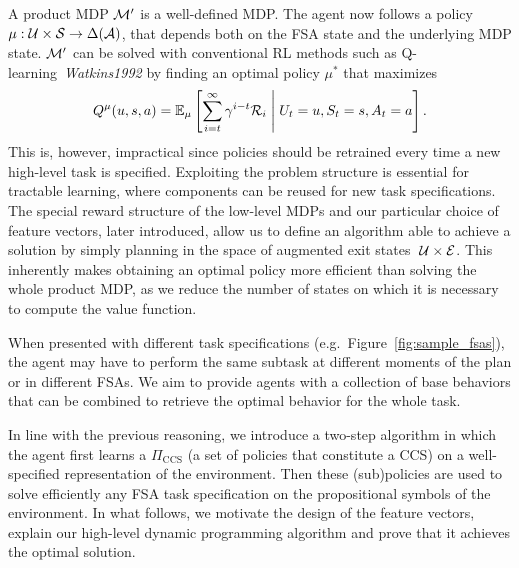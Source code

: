A product MDP $\mathcal{M}'$ is a well-defined MDP. The agent now follows a policy $\mu:\mathcal{U}\times\mathcal{S}\rightarrow\Delta(\mathcal{A})$, that depends both on the FSA state and the underlying MDP state. $\mathcal{M}'$ can be solved with conventional RL methods such as Q-learning~\textit{Watkins1992} by finding an optimal policy $\mu^*$ that maximizes
\begin{equation*}
Q^\mu(u, s, a) = \mathbb{E}_{\mu}\left[\sum_{i=t}^\infty \gamma^{i-t}\mathcal{R}_i\;\middle\lvert\;U_t= u, S_t=s, A_t=a\right].
\end{equation*}
This is, however, impractical since policies should be retrained every time a new high-level task is specified. Exploiting the problem structure is essential for tractable learning, where components can be reused for new task specifications. The special reward structure of the low-level MDPs and our particular choice of feature vectors, later introduced, allow us to define an algorithm able to achieve a solution by simply planning in the space of augmented exit states $\;\mathcal{U}\times\mathcal{E}$. This inherently makes obtaining an optimal policy more efficient than solving the whole product MDP, as we reduce the number of states on which it is necessary to compute the value function.

 When presented with different task specifications (e.g.~Figure~\ref{fig:sample_fsas}), the agent may have to perform the same subtask at different moments of the plan or in different FSAs. We aim to provide agents with a collection of base behaviors that can be combined to retrieve the optimal behavior for the whole task.

In line with the previous reasoning, we introduce a two-step algorithm in which the agent first learns a $\Pi_{\text{CCS}}$ (a set of policies that constitute a CCS) on a well-specified representation of the environment. Then these (sub)policies are used to solve efficiently any FSA task specification on the propositional symbols of the environment. In what follows, we motivate the design of the feature vectors, explain our high-level dynamic programming algorithm and prove that it achieves the optimal solution.


